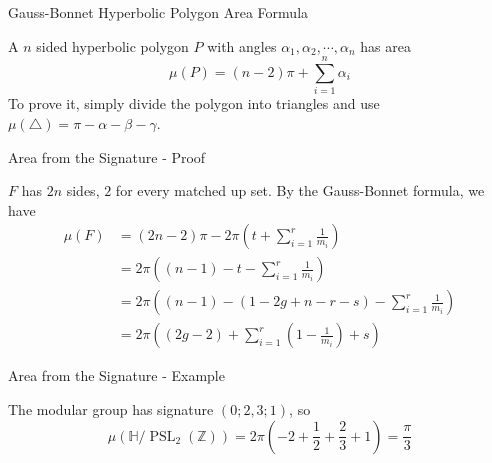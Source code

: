\documentclass[
	american,
	sections numbered,
	usenames,
	xcolor=dvipsnames,
	aspectratio=169,
]{beamer}
\renewcommand{\H}{\mathbb{H}}
\DeclareMathOperator{\PSL}{PSL}
\theoremstyle{plain}%
\begin{document}
\begin{frame}{Gauss-Bonnet Hyperbolic Polygon Area Formula}

	\begin{lemma}
        A $n$ sided hyperbolic polygon $P$ with angles $\alpha_1,\alpha_2,\cdots,\alpha_n$ has area $$\mu(P)=(n-2)\pi+\sum_{i=1}^n\alpha_i$$
        To prove it, simply divide the polygon into triangles and use $\mu(\triangle)=\pi-\alpha-\beta-\gamma$.
    \end{lemma}

\end{frame}

\begin{frame}{Area from the Signature - Proof}

	$F$ has $2n$ sides, $2$ for every matched up set. By the Gauss-Bonnet formula, we have 
    \begin{align*}
        \mu(F) &= (2n-2)\pi-2\pi\left(t+\sum_{i=1}^r\frac{1}{m_i}\right)\\
        &= 2\pi\left((n-1)-t-\sum_{i=1}^r\frac{1}{m_i}\right)\\
        &= 2\pi\left((n-1)-(1-2g+n-r-s)-\sum_{i=1}^r\frac{1}{m_i}\right)\\
        &= 2\pi\left((2g-2)+\sum_{i=1}^r \left(1-\frac{1}{m_i}\right)+s\right)
    \end{align*}

\end{frame}

\begin{frame}{Area from the Signature - Example}

    \begin{minipage}{0.39\textwidth}
		\begin{center}
        \end{center}
	\end{minipage}
	\begin{minipage}{0.6\textwidth}
        The modular group has signature $(0;2,3;1)$, so 
        $$\mu(\H/\PSL_2(\mathbb{Z}))=2\pi\left(-2+\frac{1}{2}+\frac{2}{3}+1\right)=\frac{\pi}{3}$$
	\end{minipage}

\end{frame}
\end{document}
